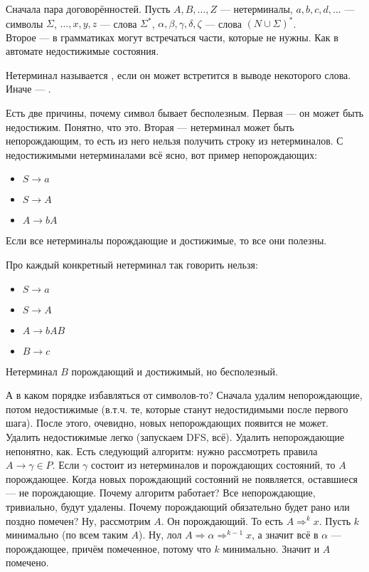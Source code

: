 \documentclass{article}
\begin{document}
\begin{itemize}
\begin{Comment}
            Сначала пара договорённостей. Пусть $A,B,\ldots,Z$ --- нетерминалы, $a,b,c,d,\ldots$ --- символы $\Sigma$, $\ldots,x,y,z$ --- слова $\Sigma^*$, $\alpha,\beta,\gamma,\delta,\zeta$ --- слова $(N\cup\Sigma)^*$.\\
            Второе --- в грамматиках могут встречаться части, которые не нужны. Как в автомате недостижимые состояния.
        \end{Comment}
        \dfn Нетерминал называется , если он может встретится в выводе некоторого слова. Иначе --- .
        \begin{Comment}
            Есть две причины, почему символ бывает бесполезным. Первая --- он может быть недостижим. Понятно, что это. Вторая --- нетерминал может быть непорождающим, то есть из него нельзя получить строку из нетерминалов. С недостижимыми нетерминалами всё ясно, вот пример непорождающих:
            \begin{itemize}
                \item $S\to a$
                \item $S\to A$
                \item $A\to bA$
            \end{itemize}
        \end{Comment}
        \thm Если все нетерминалы порождающие и достижимые, то все они полезны.
        \begin{Comment}
            Про каждый конкретный нетерминал так говорить нельзя:
            \begin{itemize}
                \item $S\to a$
                \item $S\to A$
                \item $A\to bAB$
                \item $B\to c$
            \end{itemize}
            Нетерминал $B$ порождающий и достижимый, но бесполезный.
        \end{Comment}
        \begin{Comment}
            А в каком порядке избавляться от символов-то? Сначала удалим непорождающие, потом недостижимые (в.т.ч. те, которые станут недостидимыми после первого шага). После этого, очевидно, новых непорождающих появится не может.\\
            Удалить недостижимые легко (запускаем DFS, всё). Удалить непорождающие непонятно, как. Есть следующий алгоритм: нужно рассмотреть правила $A\to\gamma\in P$. Если $\gamma$ состоит из нетерминалов и порождающих состояний, то $A$ порождающее. Когда новых порождающий состояний не появляется, оставшиеся --- не порождающие. Почему алгоритм работает? Все непорождающие, тривиально, будут удалены. Почему порождающий обязательно будет рано или поздно помечен? Ну, рассмотрим $A$. Он порождающий. То есть $A\Rightarrow^kx$. Пусть $k$ минимально (по всем таким $A$). Ну, лол $A\Rightarrow\alpha\Rightarrow^{k-1}x$, а значит всё в $\alpha$ --- порождающее, причём помеченное, потому что $k$ минимально. Значит и $A$ помечено.

\end{Comment}
\end{itemize}
\end{document}
